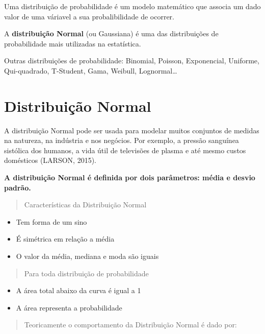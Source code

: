 \documentclass[
]{book}
\begin{document}
Uma distribuição de probabilidade é um modelo matemático que associa um dado valor de uma váriavel a sua probalibilidade de ocorrer.

A \textbf{distribuição Normal} (ou Gaussiana) é uma das distribuições de probabilidade mais utilizadas na estatística.

Outras distribuições de probabilidade: Binomial, Poisson, Exponencial, Uniforme, Qui-quadrado, T-Student, Gama, Weibull, Lognormal\ldots{}

\section{Distribuição Normal}\label{distribuiuxe7uxe3o-normal}

A distribuição Normal pode ser usada para modelar muitos conjuntos de medidas na natureza, na indústria e nos negócios. Por exemplo, a pressão sanguínea sistólica dos humanos, a vida útil de televisões de plasma e até mesmo custos domésticos (LARSON, 2015).

\textbf{A distribuição Normal é definida por dois parâmetros: média e desvio padrão.}

\begin{quote}
Características da Distribuição Normal
\end{quote}

\begin{itemize}
\item
  Tem forma de um sino
\item
  É simétrica em relação a média
\item
  O valor da média, mediana e moda são iguais
\end{itemize}

\begin{quote}
Para toda distribuição de probabilidade
\end{quote}

\begin{itemize}
\item
  A área total abaixo da curva é igual a 1
\item
  A área representa a probabilidade
\end{itemize}

\begin{quote}
Teoricamente o comportamento da Distribuição Normal é dado por:
\end{quote}
\end{document}
